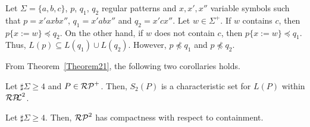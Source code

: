 \begin{ex}
    Let $\Sigma = \{a,b,c\}$, $p$, $q_{1}$, $q_{2}$ regular patterns and
    $x,x',x''$ variable symbols such that
    $p = x'axbx''$, $q_{1} = x'abx''$ and $q_{2} = x'cx''$.
    Let $w \in \Sigma^{+}$.
    If $w$ contains $c$, then $p \{x:=w\} \preceq q_{2}$.
    On the other hand, if $w$ does not contain $c$,
    then $p\{x:=w\} \preceq q_{1}$.
    Thus, $L(p) \subseteq L(q_{1}) \cup L(q_{2})$.
    However, $p \not\preceq q_{1}$ and $p \not\preceq q_{2}$.
\end{ex}

From Theorem~\ref{Theorem21}, 
the following two corollaries holds.

\begin{col}
    Let $\sharp\Sigma \geq 4$ and $P \in \mathcal{RP}^{+}$.
    Then, $S_{2}(P)$ is a characteristic set for $L(P)$ within $\mathcal{RP\!\!L}^{2}$.
\end{col}

\begin{col}
    Let $\sharp\Sigma \geq 4$.
    Then, $\mathcal{RP}^{2}$ has compactness with respect to containment.
\end{col}

